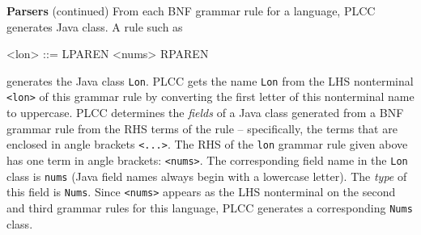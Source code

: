 \begin{minipage}[t]{\sw}
\slidenumber
\LARGE
{\bf Parsers} (continued)\exx
\emm\LightBox{\MYlon}\exx
From each BNF grammar rule for a language,
PLCC generates Java class.
A rule such as
\begin{qv}
<lon> ::= LPAREN <nums> RPAREN
\end{qv}
generates the Java class \verb'Lon'.
PLCC gets the name \verb'Lon'
from the LHS nonterminal \verb'<lon>' of this grammar rule
by converting the first letter of this nonterminal name to uppercase.\exx
PLCC determines the {\em fields}
of a Java class generated from a BNF grammar rule
from the RHS terms of the rule --
specifically, the terms that are enclosed in angle brackets \verb'<...>'.
The RHS of the \verb'lon' grammar rule given above
has one term in angle brackets:
\verb'<nums>'.
The corresponding field name in the \verb'Lon' class
is \verb'nums' (Java field names always begin with a lowercase letter).
The {\em type} of this field is \verb'Nums'.\exx
Since \verb'<nums>' appears as the LHS nonterminal
on the second and third grammar rules for this language,
PLCC generates a corresponding \verb'Nums' class.
\end{minipage}
\clearpage
